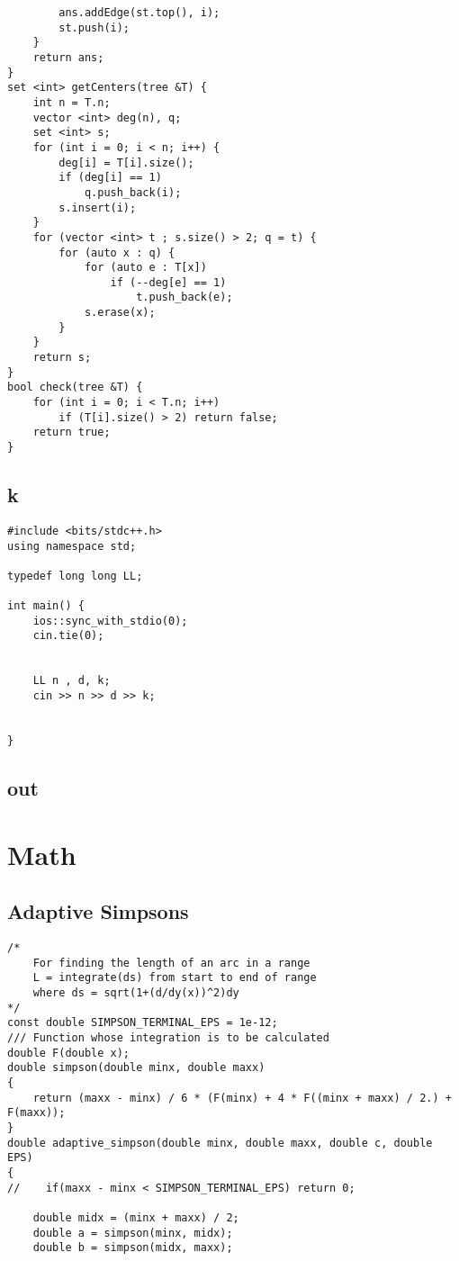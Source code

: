 \documentclass[FSZ,a4paper,onesided]{article}
\begin{document}
\begin{multicols*}{\COLS}
\begin{lstlisting}
        ans.addEdge(st.top(), i);
        st.push(i);
    }
    return ans;
}
set <int> getCenters(tree &T) {
    int n = T.n;
    vector <int> deg(n), q;
    set <int> s;
    for (int i = 0; i < n; i++) {
        deg[i] = T[i].size();
        if (deg[i] == 1)
            q.push_back(i);
        s.insert(i);
    }
    for (vector <int> t ; s.size() > 2; q = t) {
        for (auto x : q) {
            for (auto e : T[x]) 
                if (--deg[e] == 1)
                    t.push_back(e);
            s.erase(x);
        }
    }
    return s;
}
bool check(tree &T) {
    for (int i = 0; i < T.n; i++)
        if (T[i].size() > 2) return false;
    return true;
}\end{lstlisting}
\subsection{k}
\begin{lstlisting}
#include <bits/stdc++.h>
using namespace std;

typedef long long LL;

int main() {
    ios::sync_with_stdio(0);
    cin.tie(0);


    LL n , d, k;
    cin >> n >> d >> k;

    
}

\end{lstlisting}
\subsection{out}
\section{Math}
\subsection{Adaptive Simpsons}
\begin{lstlisting}
/*
    For finding the length of an arc in a range
    L = integrate(ds) from start to end of range
    where ds = sqrt(1+(d/dy(x))^2)dy
*/
const double SIMPSON_TERMINAL_EPS = 1e-12;
/// Function whose integration is to be calculated
double F(double x);
double simpson(double minx, double maxx)
{
    return (maxx - minx) / 6 * (F(minx) + 4 * F((minx + maxx) / 2.) + F(maxx));
}
double adaptive_simpson(double minx, double maxx, double c, double EPS)
{
//    if(maxx - minx < SIMPSON_TERMINAL_EPS) return 0;

    double midx = (minx + maxx) / 2;
    double a = simpson(minx, midx);
    double b = simpson(midx, maxx);


\end{lstlisting}
\end{multicols*}
\end{document}
